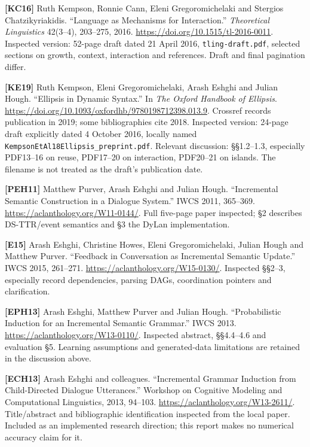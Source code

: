 \documentclass[11pt,a4paper]{article}
\begin{document}
\textbf{{[}KC16{]}} Ruth Kempson, Ronnie Cann, Eleni Gregoromichelaki
and Stergios Chatzikyriakidis. ``Language as Mechanisms for
Interaction.'' \emph{Theoretical Linguistics} 42(3--4), 203--275, 2016.
\url{https://doi.org/10.1515/tl-2016-0011}. Inspected version: 52-page
draft dated 21 April 2016, \texttt{tling-draft.pdf}, selected sections
on growth, context, interaction and references. Draft and final
pagination differ.

\textbf{{[}KE19{]}} Ruth Kempson, Eleni Gregoromichelaki, Arash Eshghi
and Julian Hough. ``Ellipsis in Dynamic Syntax.'' In \emph{The Oxford
Handbook of Ellipsis}.
\url{https://doi.org/10.1093/oxfordhb/9780198712398.013.9}. Crossref
records publication in 2019; some bibliographies cite 2018. Inspected
version: 24-page draft explicitly dated 4 October 2016, locally named
\nolinkurl{KempsonEtAl18Ellipsis_preprint.pdf}. Relevant discussion:
§§1.2--1.3, especially PDF13--16 on reuse, PDF17--20 on interaction,
PDF20--21 on islands. The filename is not treated as the draft's
publication date.

\textbf{{[}PEH11{]}} Matthew Purver, Arash Eshghi and Julian Hough.
``Incremental Semantic Construction in a Dialogue System.'' IWCS 2011,
365--369. \url{https://aclanthology.org/W11-0144/}. Full five-page paper
inspected; §2 describes DS-TTR/event semantics and §3 the DyLan
implementation.

\textbf{{[}E15{]}} Arash Eshghi, Christine Howes, Eleni
Gregoromichelaki, Julian Hough and Matthew Purver. ``Feedback in
Conversation as Incremental Semantic Update.'' IWCS 2015, 261--271.
\url{https://aclanthology.org/W15-0130/}. Inspected §§2--3, especially
record dependencies, parsing DAGs, coordination pointers and
clarification.

\textbf{{[}EPH13{]}} Arash Eshghi, Matthew Purver and Julian Hough.
``Probabilistic Induction for an Incremental Semantic Grammar.'' IWCS
2013. \url{https://aclanthology.org/W13-0110/}. Inspected abstract,
§§4.4--4.6 and evaluation §5. Learning assumptions and generated-data
limitations are retained in the discussion above.

\textbf{{[}ECH13{]}} Arash Eshghi and colleagues. ``Incremental Grammar
Induction from Child-Directed Dialogue Utterances.'' Workshop on
Cognitive Modeling and Computational Linguistics, 2013, 94--103.
\url{https://aclanthology.org/W13-2611/}. Title/abstract and
bibliographic identification inspected from the local paper. Included as
an implemented research direction; this report makes no numerical
accuracy claim for it.
\end{document}
